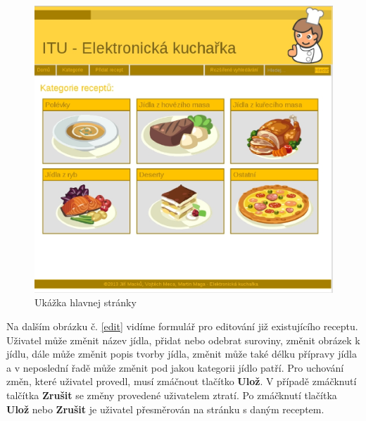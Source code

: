 \documentclass[12pt,a4paper,titlepage,final]{article}
\begin{document}
\begin{figure}

\begin{center}

\includegraphics[scale=0.6]{img/home.eps} 
\caption{Ukážka hlavnej stránky}
\label{koncept}

\end{center}

\end{figure}
\newpage
Na dalším obrázku č. \ref{edit} vidíme formulář pro editování již existujícího receptu. Uživatel může změnit název jídla, přidat nebo odebrat suroviny, změnit obrázek k jídlu, dále může změnit popis tvorby jídla, změnit může také délku přípravy jídla a v neposlední řadě může změnit pod jakou kategorii jídlo patří. Pro uchování změn, které uživatel provedl, musí zmáčnout tlačítko \textbf{Ulož}. V případě zmáčknutí talčítka \textbf{Zrušit} se změny provedené uživatelem ztratí. Po zmáčknutí tlačítka \textbf{Ulož} nebo \textbf{Zrušit} je uživatel přesměrován na stránku s daným receptem.\newline
\end{document}
